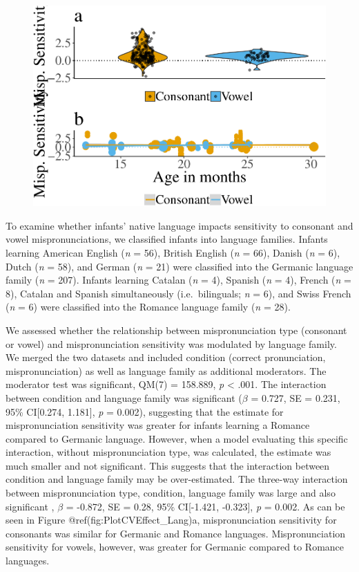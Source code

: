 \documentclass[man]{apa6}
\theoremstyle{definition}
\theoremstyle{definition}
\theoremstyle{definition}
\theoremstyle{remark}
\begin{document}
\begin{figure}
\centering
\includegraphics{VonHolzenBergmann_MPMetaAnalysis_files/figure-latex/PlotMispType-1.pdf}
\caption{}
\end{figure}

To examine whether infants' native language impacts sensitivity to
consonant and vowel mispronunciations, we classified infants into
language families. Infants learning American English (\emph{n} = 56),
British English (\emph{n} = 66), Danish (\emph{n} = 6), Dutch (\emph{n}
= 58), and German (\emph{n} = 21) were classified into the Germanic
language family (\emph{n} = 207). Infants learning Catalan (\emph{n} =
4), Spanish (\emph{n} = 4), French (\emph{n} = 8), Catalan and Spanish
simultaneously (i.e.~bilinguals; \emph{n} = 6), and Swiss French
(\emph{n} = 6) were classified into the Romance language family
(\emph{n} = 28).

We assessed whether the relationship between mispronunciation type
(consonant or vowel) and mispronunciation sensitivity was modulated by
language family. We merged the two datasets and included condition
(correct pronunciation, mispronunciation) as well as language family as
additional moderators. The moderator test was significant, QM(7) =
158.889, \emph{p} \textless{} .001. The interaction between condition
and language family was significant (\(\beta\) = 0.727, SE = 0.231, 95\%
CI{[}0.274, 1.181{]}, \emph{p} = 0.002), suggesting that the estimate
for mispronunciation sensitivity was greater for infants learning a
Romance compared to Germanic language. However, when a model evaluating
this specific interaction, without mispronunciation type, was
calculated, the estimate was much smaller and not significant. This
suggests that the interaction between condition and language family may
be over-estimated. The three-way interaction between mispronunciation
type, condition, language family was large and also significant ,
\(\beta\) = -0.872, SE = 0.28, 95\% CI{[}-1.421, -0.323{]}, \emph{p} =
0.002. As can be seen in Figure @ref(fig:PlotCVEffect\_Lang)a,
mispronunciation sensitivity for consonants was similar for Germanic and
Romance languages. Mispronunciation sensitivity for vowels, however, was
greater for Germanic compared to Romance languages.
\end{document}
